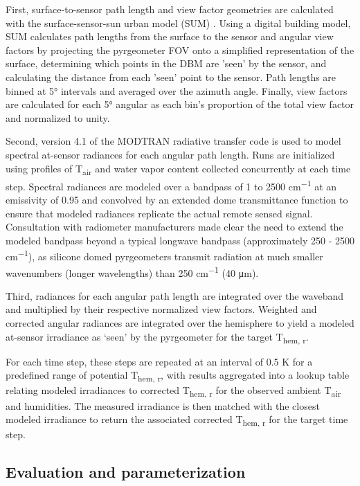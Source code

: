 \begin{bibunit}
First, surface-to-sensor path length and view factor geometries are calculated with the surface-sensor-sun urban model (SUM) \citep{Soux2004}. Using a digital building model, SUM calculates path lengths from the surface to the sensor and angular view factors by projecting the pyrgeometer FOV onto a simplified representation of the surface, determining which points in the DBM are 'seen' by the sensor, and calculating the distance from each 'seen' point to the sensor. Path lengths are binned at 5\si{\degree} intervals and averaged over the azimuth angle. Finally, view factors are calculated for each 5\si{\degree} angular as each bin's proportion of the total view factor and normalized to unity.

Second, version 4.1 of the MODTRAN radiative transfer code \citep{Berk1987} is used to model spectral at-sensor radiances for each angular path length. Runs are initialized using profiles of T\textsubscript{air} and water vapor content collected concurrently at each time step. Spectral radiances are modeled over a bandpass of 1 to 2500 \si{cm^{-1}} at an emissivity of 0.95 and convolved by an extended dome transmittance function to ensure that modeled radiances replicate the actual remote sensed signal. Consultation with radiometer manufacturers made clear the need to extend the modeled bandpass beyond a typical longwave bandpass (approximately 250 - 2500 \si{cm^{-1}}), as silicone domed pyrgeometers transmit radiation at much smaller wavenumbers (longer wavelengths) than 250 \si{cm^{-1}} (40 \si{\micro\meter}).

Third, radiances for each angular path length are integrated over the waveband and multiplied by their respective normalized view factors. Weighted and corrected angular radiances are integrated over the hemisphere to yield a modeled at-sensor irradiance as ‘seen’ by the pyrgeometer for the target T\textsubscript{hem, r}. 

For each time step, these steps are repeated at an interval of 0.5 \si{\kelvin} for a predefined range of potential T\textsubscript{hem, r}, with results aggregated into a lookup table relating modeled irradiances to corrected T\textsubscript{hem, r} for the observed ambient T\textsubscript{air} and humidities. The measured irradiance is then matched with the closest modeled irradiance to return the associated corrected T\textsubscript{hem, r} for the target time step. 

\subsection{Evaluation and parameterization}


\end{bibunit}
